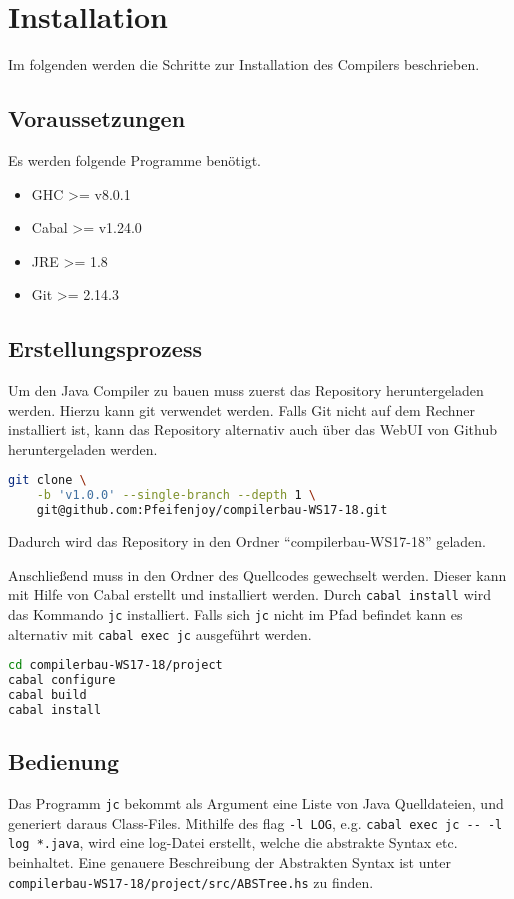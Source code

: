 \chapter{Installation}

Im folgenden werden die Schritte zur Installation des Compilers beschrieben.

\section{Voraussetzungen}

Es werden folgende Programme benötigt.
\begin{itemize}
	\item GHC >= v8.0.1
	\item Cabal >= v1.24.0
	\item JRE >= 1.8
	\item Git >= 2.14.3
\end{itemize}

\section{Erstellungsprozess}

Um den Java Compiler zu bauen muss zuerst das Repository heruntergeladen werden.
Hierzu kann git verwendet werden. Falls Git nicht auf dem Rechner installiert ist,
kann das Repository alternativ auch über das WebUI von Github heruntergeladen werden.

\begin{lstlisting}[language=bash, caption={ Download des Projektes }]
git clone \
	-b 'v1.0.0' --single-branch --depth 1 \
	git@github.com:Pfeifenjoy/compilerbau-WS17-18.git
\end{lstlisting}

Dadurch wird das Repository in den Ordner \enquote{compilerbau-WS17-18} geladen.

Anschließend muss in den Ordner des Quellcodes gewechselt werden.
Dieser kann mit Hilfe von Cabal erstellt und installiert werden.
Durch \lstinline{cabal install} wird das Kommando \lstinline{jc} installiert.
Falls sich \lstinline{jc} nicht im Pfad befindet kann es alternativ mit \lstinline{cabal exec jc}
ausgeführt werden.
\begin{lstlisting}[language=bash, caption={Bauen des jc Kommandos}]
cd compilerbau-WS17-18/project
cabal configure
cabal build
cabal install
\end{lstlisting}

\section{Bedienung}
Das Programm \lstinline{jc} bekommt als Argument eine Liste von Java Quelldateien,
und generiert daraus Class-Files.
Mithilfe des flag \lstinline{-l LOG}, e.g. \lstinline{cabal exec jc -- -l log *.java},
wird eine log-Datei erstellt, welche die abstrakte Syntax etc. beinhaltet.
Eine genauere Beschreibung der Abstrakten Syntax ist unter
\lstinline{compilerbau-WS17-18/project/src/ABSTree.hs} zu finden.


